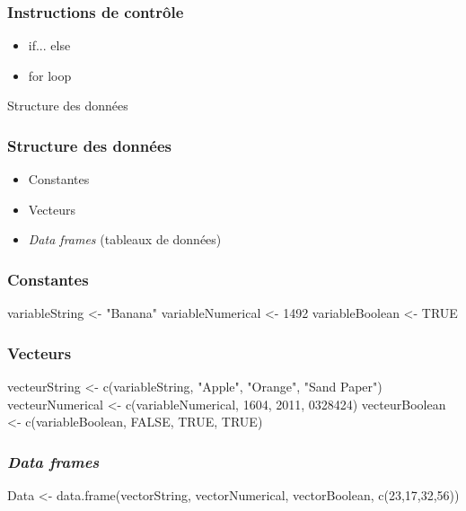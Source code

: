 \documentclass{beamer}
\begin{document}
    \begin{frame}
        \frametitle{Instructions de contrôle}
        \begin{itemize}
            \item if... else
            \item for loop
        \end{itemize}
    \end{frame}

\begin{frame}
     \begin{center}
          \Huge \R {} Structure des données
      \end{center}
    \end{frame}

    \begin{frame}
        \frametitle{Structure des données}
        \begin{itemize}
            \item<1-> Constantes
            \item<2-> Vecteurs
            \item<3-> \emph{Data frames} (tableaux de données)
        \end{itemize}
    \end{frame}
    
    \begin{frame}[fragile=singleslide]
        \frametitle{Constantes}
        \begin{code}
variableString <- "Banana"
variableNumerical <- 1492
variableBoolean <- TRUE
        \end{code}
    \end{frame}
    
    \begin{frame}[fragile=singleslide]
        \frametitle{Vecteurs}
        \begin{code}
vecteurString <- c(variableString, "Apple", "Orange", "Sand Paper")
vecteurNumerical <- c(variableNumerical, 1604, 2011, 0328424)
vecteurBoolean <- c(variableBoolean, FALSE, TRUE, TRUE)
        \end{code}
    \end{frame}
    
    \begin{frame}[fragile=singleslide]
        \frametitle{\emph{Data frames}}
        \begin{code}
Data <- data.frame(vectorString, vectorNumerical, vectorBoolean, c(23,17,32,56))
        \end{code}
    \end{frame}
\end{document}
